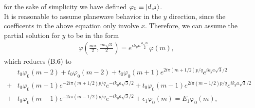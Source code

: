 \documentclass{report}
\newcommand{\f}[2]{\dfrac{#1}{#2}}
\begin{document}
for the sake of simplicity we have defined $\varphi_{0} \equiv \ket{d_{z^{2}}}$.\\
It is reasonable to assume planewave behavior in the $y$ direction, since the coefficents in the above equation only involve $x$. Therefore, we can assume the partial solution for $y$ to be in the form
\begin{gather}
	\varphi(\frac{ma}{2},\frac{na\sqrt{3}}{2}) = e^{i k_{y} n \frac{a\sqrt{3}}{2}} \varphi(m),
\end{gather}
which reduces (B.6) to
\begin{equation}
	\begin{aligned}
		  & t_{0} \varphi_{0}(m + 2) + t_{0} \varphi_{0}(m - 2) + t_{0} \varphi_{0}(m + 1) e^{2 i \pi (m + 1 /2) p/ q} e^{i k_{y} a\sqrt{3} / 2}                              \\
		+ & t_{0} \varphi_{0}(m + 1) e^{-2 i \pi (m + 1 /2) p/ q} e^{-i k_{y} a\sqrt{3} / 2} + t_{0} \varphi_{0}(m - 1) e^{2 i \pi (m - 1 /2) p/ q} e^{i k_{y} a\sqrt{3} / 2} \\
		+ & t_{0} \varphi_{0}(m - 1) e^{-2 i \pi (m - 1 /2) p/ q} e^{-i k_{y} a\sqrt{3} / 2} + \epsilon_{1} \varphi_{0}(m) = E_{1} \varphi_{0}(m),
	\end{aligned}
\end{equation}
\end{document}

